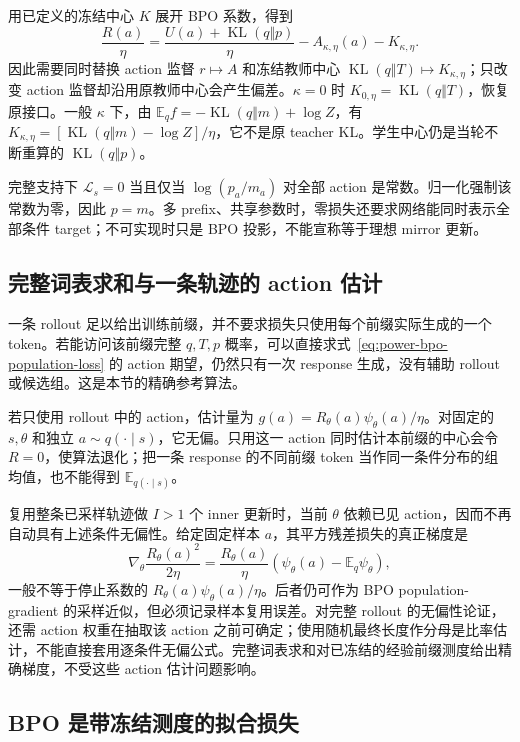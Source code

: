 \documentclass[lang=cn,scheme=chinese,openany]{../book/elegantbook}
\newcommand{\E}{\mathbb E}
\newcommand{\KL}{\operatorname{KL}}
\begin{document}
用已定义的冻结中心 $K$ 展开 BPO 系数，得到
\begin{equation}
 \frac{R(a)}\eta
 =\frac{U(a)+\KL(q\Vert p)}\eta-A_{\kappa,\eta}(a)-K_{\kappa,\eta}.
\end{equation}
因此需要同时替换 action 监督 $r\mapsto A$ 和冻结教师中心 $\KL(q\Vert T)\mapsto K_{\kappa,\eta}$；只改变 action 监督却沿用原教师中心会产生偏差。$\kappa=0$ 时 $K_{0,\eta}=\KL(q\Vert T)$，恢复原接口。一般 $\kappa$ 下，由 $\E_qf=-\KL(q\Vert m)+\log Z$，有 $K_{\kappa,\eta}=[\KL(q\Vert m)-\log Z]/\eta$，它不是原 teacher KL。学生中心仍是当轮不断重算的 $\KL(q\Vert p)$。

完整支持下 $\mathcal L_s=0$ 当且仅当 $\log(p_a/m_a)$ 对全部 action 是常数。归一化强制该常数为零，因此 $p=m$。多 prefix、共享参数时，零损失还要求网络能同时表示全部条件 target；不可实现时只是 BPO 投影，不能宣称等于理想 mirror 更新。
\subsection{完整词表求和与一条轨迹的 action 估计}

一条 rollout 足以给出训练前缀，并不要求损失只使用每个前缀实际生成的一个 token。若能访问该前缀完整 $q,T,p$ 概率，可以直接求式~\eqref{eq:power-bpo-population-loss} 的 action 期望，仍然只有一次 response 生成，没有辅助 rollout 或候选组。这是本节的精确参考算法。

若只使用 rollout 中的 action，估计量为 $g(a)=R_\theta(a)\psi_\theta(a)/\eta$。对固定的 $s,\theta$ 和独立 $a\sim q(\cdot\mid s)$，它无偏。只用这一 action 同时估计本前缀的中心会令 $R=0$，使算法退化；把一条 response 的不同前缀 token 当作同一条件分布的组均值，也不能得到 $\E_{q(\cdot\mid s)}$。

复用整条已采样轨迹做 $I>1$ 个 inner 更新时，当前 $\theta$ 依赖已见 action，因而不再自动具有上述条件无偏性。给定固定样本 $a$，其平方残差损失的真正梯度是
\begin{equation}
 \nabla_\theta\frac{R_\theta(a)^2}{2\eta}
 =\frac{R_\theta(a)}\eta(\psi_\theta(a)-\E_q\psi_\theta),
\end{equation}
一般不等于停止系数的 $R_\theta(a)\psi_\theta(a)/\eta$。后者仍可作为 BPO population-gradient 的采样近似，但必须记录样本复用误差。对完整 rollout 的无偏性论证，还需 action 权重在抽取该 action 之前可确定；使用随机最终长度作分母是比率估计，不能直接套用逐条件无偏公式。完整词表求和对已冻结的经验前缀测度给出精确梯度，不受这些 action 估计问题影响。
\subsection{BPO 是带冻结测度的拟合损失}
\end{document}
